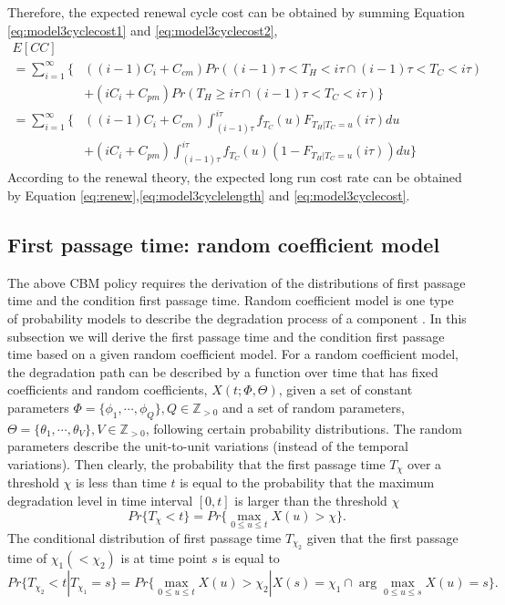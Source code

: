 \documentclass[10pt,a4paper]{article}
\theoremstyle{remark}
\begin{document}
Therefore, the expected renewal cycle cost can be obtained by summing Equation \ref{eq:model3cyclecost1} and \ref{eq:model3cyclecost2},
\begin{align} \label{eq:model3cyclecost}
 E[CC] \nonumber \\
 =\sum_{i=1}^{\infty} \Bigg\{ & ((i-1)C_{i}+C_{cm})Pr((i-1)\tau<T_{H}<i\tau \cap (i-1)\tau<T_{C}<i\tau ) \nonumber \\
 & + (iC_{i}+C_{pm})Pr(T_{H}\geq i\tau \cap (i-1)\tau<T_{C}<i\tau ) \Bigg\} \nonumber \\
 = \sum_{i=1}^{\infty} \Bigg\{ & ((i-1)C_{i}+C_{cm})\int_{(i-1)\tau}^{i\tau} f_{T_{C}}(u) F_{T_{H}|T_{C}=u}(i\tau)du \nonumber \\
 & +(iC_{i}+C_{pm})\int_{(i-1)\tau}^{i\tau} f_{T_{C}}(u) (1-F_{T_{H}|T_{C}=u}(i\tau))du \Bigg\}  
\end{align}
According to the renewal theory, the expected long run cost rate can be obtained by Equation \ref{eq:renew},\ref{eq:model3cyclelength} and \ref{eq:model3cyclecost}.

\subsection{First passage time: random coefficient model}
The above CBM policy requires the derivation of the distributions of first passage time and the condition first passage time. Random coefficient model is one type of probability models to describe the degradation process of a component \cite{ZhuPengvanHoutum14}. In this subsection we will derive the first passage time and the condition first passage time based on a given random coefficient model. For a random coefficient model, the degradation path can be described by a function over time that has fixed coefficients and random coefficients, $X(t;\Phi,\Theta)$, given a set of constant parameters $\Phi=\{\phi_{1}, \cdots, \phi_{Q}\}, Q \in \mathbb Z_{> 0} $ and a set of random parameters, $\Theta=\{\theta_{1}, \cdots, \theta_{V}\}, V \in \mathbb Z_{> 0} $, following certain probability distributions. The random parameters describe the unit-to-unit variations (instead of the temporal variations). Then clearly, the probability that the first passage time $T_{\chi}$ over a threshold $\chi$  is less than time $t$ is equal to the probability that the maximum degradation level in time interval $[0,t]$ is larger than the threshold $\chi$ 
\begin{equation} \label{eq:degradation2.1}
Pr\{T_{\chi}< t\}=Pr\{\max_{0\leq u\leq t} X(u)> \chi \}.
\end{equation}
The conditional distribution of first passage time $T_{\chi_{2}}$ given that the first passage time of $\chi_{1} (< \chi_{2})$ is at time point $s$ is equal to
\begin{equation} \label{eq:degradation2.2}
Pr\{T_{\chi_{2}}< t | T_{\chi_{1}}=s \}=Pr\{\max_{0\leq u\leq t} X(u)> \chi_{2} | X(s)=\chi_{1} \cap \arg \max_{0\leq u\leq s} X(u) =s\}. 
\end{equation}
\end{document}
